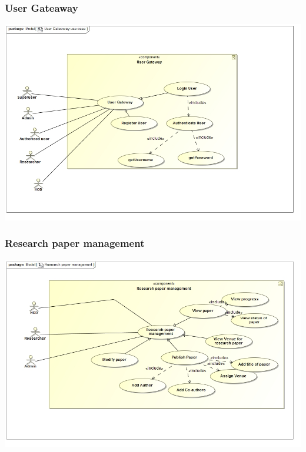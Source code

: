 \documentclass[11pt]{article}
\begin{document}
\begin{center}
\subsubsection{User Gateaway}
\begin{center} 
	\includegraphics[width=\textwidth]{../Images/UserGateawayUC.jpg}\\[0.5cm]
\end{center}
\subsubsection{Research paper management}
\begin{center} 
	\includegraphics[width=\textwidth]{../Images/ResearchpapermanagementUC.jpg}\\[0.5cm]
\end{center}

\end{center}
\end{document}
